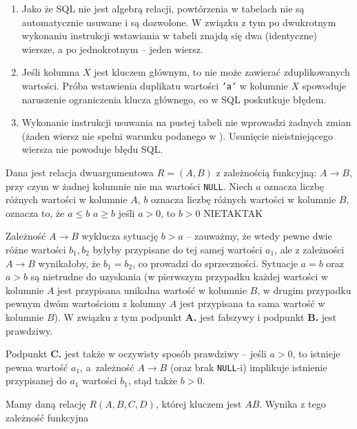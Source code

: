\begin{solutions}
    \begin{enumerate}[\bf A.]
        \item Jako że SQL nie jest algebrą relacji, powtórzenia w tabelach nie są automatycznie usuwane i są dozwolone. W związku z tym po dwukrotnym wykonaniu instrukcji wstawiania w tabeli znajdą się dwa (identyczne) wiersze, a po jednokrotnym -- jeden wiersz.

        \item Jeśli kolumna $X$ jest kluczem głównym, to nie może zawierać zduplikowanych wartości. Próba wstawienia duplikatu wartości \texttt{'a'} w kolumnie $X$ spowoduje naruszenie ograniczenia klucza głównego, co w SQL poskutkuje błędem.

        \item Wykonanie instrukcji usuwania na pustej tabeli nie wprowadzi żadnych zmian (żaden wiersz nie spełni warunku podanego w ). Usunięcie nieistniejącego wiersza nie powoduje błędu SQL.
    \end{enumerate}

    \sol Dana jest relacja dwuargumentowa $R = (A, B)$ z zależnością funkcyjną: $A \to B$, przy czym w żadnej kolumnie nie ma wartości \texttt{NULL}. Niech $a$ oznacza liczbę różnych wartości w kolumnie $A$, $b$ oznacza liczbę różnych wartości w kolumnie $B$, oznacza to, że
    \answerss
    {$a \leq b$}
    {$a \geq b$}
    {jeśli $a>0$, to $b>0$}
    {NIE}{TAK}{TAK}

    Zależność $A \to B$ wyklucza sytuację $b > a$ -- zauważmy, że wtedy pewne dwie różne wartości $b_1, b_2$ byłyby przypisane do tej samej wartości $a_1$, ale z zależności $A \to B$ wynikałoby, że $b_1 = b_2$, co prowadzi do sprzeczności. Sytuacje $a = b$ oraz $a > b$ są nietrudne do uzyskania (w pierwszym przypadku każdej wartości w kolumnie $A$ jest przypisana unikalna wartość w kolumnie $B$, w drugim przypadku pewnym dwóm wartościom z kolumny $A$ jest przypisana ta sama wartość w kolumnie $B$). W związku z tym podpunkt \textbf{A.} jest fałszywy i podpunkt \textbf{B.} jest prawdziwy.

    Podpunkt \textbf{C.} jest także w oczywisty sposób prawdziwy -- jeśli $a > 0$, to istnieje pewna wartość $a_1$, a~zależność $A \to B$ (oraz brak \texttt{NULL}-i) implikuje istnienie przypisanej do $a_1$ wartości $b_1$, stąd także $b > 0$.

    \sol Mamy daną relację $R(A,B,C,D)$, której kluczem jest $AB$. Wynika z tego zależność funkcyjna
    

\end{solutions}
